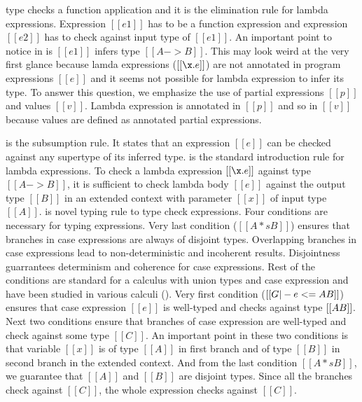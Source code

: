  type checks a function application and it is the elimination rule for lambda expressions.
Expression $[[e1]]$
has to be a function expression and expression $[[e2]]$ has to check against input type of $[[e1]]$.
An important point to notice in  is $[[e1]]$ infers type $[[A -> B]]$. This may look weird
at the very first glance because lamda expressions ($[[\x.e]]$) are not annotated in program expressions 
$[[e]]$ and it seems not possible for lambda expression to infer its type.
To answer this question, we emphasize the use of partial expressions $[[p]]$ and values $[[v]]$.
Lambda expression is annotated in $[[p]]$ and so in $[[v]]$ because values are defined as annotated
partial expressions.

 is the subsumption rule. It states that an expression $[[e]]$ can be checked 
against any supertype of its inferred type. 
 is the standard introduction rule for lambda expressions. To check a
lambda expression $[[\x.e]]$ against type $[[A -> B]]$, it is sufficient to check lambda body $[[e]]$
against the output type $[[B]]$ in an extended context with parameter $[[x]]$ of input type $[[A]]$.
 is novel typing rule to type check \typeof expressions. Four conditions are necessary
for typing \typeof expressions. Very last condition ($[[A *s B]]$) ensures that branches in case 
expressions are always of disjoint types. Overlapping branches in case expressions lead to non-deterministic
and incoherent results. Disjointness guarrantees determinism and coherence for case expressions. 
Rest of the conditions are standard for a calculus with union types and case expression and have been
studied in various calculi ().
Very first condition ($[[G |- e <= A \/ B]]$) ensures that case expression $[[e]]$ is well-typed and checks
against type $[[A \/ B]]$.
Next two conditions ensure that branches of case expression are well-typed and check against some
type $[[C]]$. An important point in these two conditions is that variable $[[x]]$ is of type $[[A]]$
in first branch and of type $[[B]]$ in second branch in the extended context.
And from the last condition $[[A *s B]]$, we guarantee that $[[A]]$ and $[[B]]$ are disjoint types.
Since all the branches check against $[[C]]$, the whole \typeof expression checks against $[[C]]$.

\begin{comment}
\begin{figure}[t]
  \begin{small}
    \centering
    \drules[typ]{$ [[G |- e dirflag A]] $}{Bidirectional Typing}{int, var, ann, app, sub, abs, typeof}
  \end{small}
  \caption{Typing for \cal.}
  \label{fig:union:typ}
\end{figure}
\end{comment}

